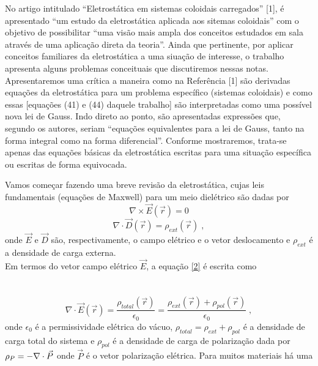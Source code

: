 \documentclass[brazilian,10.7pt,a4paper]{article}
\begin{document}
\begin{multicols}{2}
No artigo intitulado “Eletrostática em sistemas coloidais carregados” [1], é apresentado “um estudo da eletrostática aplicada aos sitemas coloidais” com o objetivo de possibilitar “uma visão mais ampla dos conceitos estudados em sala através de uma aplicação direta da teoria”. Ainda que pertinente, por aplicar conceitos familiares da eletrostática a uma siuação de interesse, o trabalho apresenta alguns problemas conceituais que discutiremos nessas notas. Apresentaremos uma crítica a maneira como na Referência [1] são derivadas equações
da eletrostática para um problema específico (sistemas coloidais) e como essas [equações (41) e (44) daquele trabalho] são interpretadas como uma possível nova lei de Gauss. Indo direto ao ponto, são apresentadas expressões que, segundo os autores, seriam “equações equivalentes para a lei de Gauss, tanto na forma integral como na forma diferencial”. Conforme mostraremos, trata-se apenas das equações básicas da eletrostática escritas para uma situação específica ou escritas de forma equivocada. \par
Vamos começar fazendo uma breve revisão da eletrostática, cujas leis fundamentais (equações de Maxwell)
para um meio dielétrico são dadas por \\
\begin{equation}\label{1}
\nabla\times\vec{E}(\vec{r}) = 0
\end{equation}
\vspace{1pt}
\begin{equation}\label{2}
\nabla\cdot\vec{D}(\vec{r}) = \rho_{ext}(\vec{r})\;, 
\end{equation}
onde $\vec{E}$ e $\vec{D}$ são, respectivamente, o campo elétrico e o vetor deslocamento e $\rho_{ext}$ é a densidade de carga externa. \\
Em termos do vetor campo elétrico $\vec{E}$, a equação \eqref{2} é escrita como \\
\\
\\
\begin{equation}\label{3}
\nabla\cdot\vec{E}(\vec{r})=\frac{\rho_{total}(\vec{r})}{\epsilon_{0}}=\frac{\rho_{ext}(\vec{r})+\rho_{pol}(\vec{r})}{\epsilon_{0}}\;,
\end{equation}
onde $\epsilon_{0}$ é a permissividade elétrica do vácuo, $\rho_{total} = \rho_{ext} + \rho_{pol}$ é a densidade de carga total do sistema e $\rho_{pol}$ é a densidade de carga de polarização dada por \;$\rho_{\large{P}} = -\nabla\cdot\vec{P}$ onde $\vec{P}$ é o vetor polarização elétrica. Para muitos materiais há uma

\end{multicols}
\end{document}
